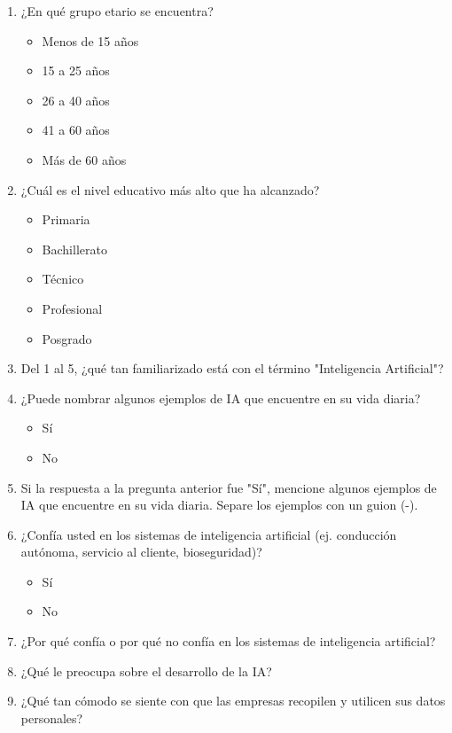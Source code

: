 \documentclass[12pt,a4paper]{article}
\begin{document}
\begin{enumerate}
    \item ¿En qué grupo etario se encuentra? \label{it:p1}
    \begin{itemize}
        \item Menos de 15 años
        \item 15 a 25 años
        \item 26 a 40 años
        \item 41 a 60 años
        \item Más de 60 años
    \end{itemize}
    \item ¿Cuál es el nivel educativo más alto que ha alcanzado? \label{it:p2}
    \begin{itemize}
        \item Primaria
        \item Bachillerato
        \item Técnico
        \item Profesional
        \item Posgrado
    \end{itemize}
    \item Del 1 al 5, ¿qué tan familiarizado está con el término "Inteligencia Artificial"? \label{it:p3}
    \item ¿Puede nombrar algunos ejemplos de IA que encuentre en su vida diaria? \label{it:p4}
    \begin{itemize}
        \item Sí
        \item No
    \end{itemize}
    \item Si la respuesta a la pregunta anterior fue "Sí", mencione algunos ejemplos de IA que 
    encuentre en su vida diaria. Separe los ejemplos con un guion (-). \label{it:p5}
    \item ¿Confía usted en los sistemas de inteligencia artificial (ej. conducción autónoma, servicio al cliente, bioseguridad)? \label{it:p6}
    \begin{itemize}
        \item Sí
        \item No
    \end{itemize}
    \item ¿Por qué confía o por qué no confía en los sistemas de inteligencia artificial? \label{it:p7}
    \item ¿Qué le preocupa sobre el desarrollo de la IA? \label{it:p8}
    \item ¿Qué tan cómodo se siente con que las empresas recopilen y utilicen sus datos personales? \label{it:p9}

\end{enumerate}
\end{document}
